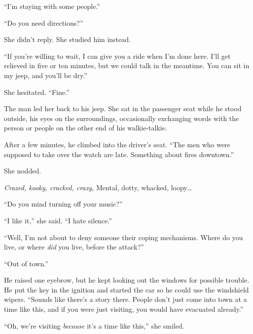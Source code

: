 ``I'm staying with some people.''



``Do you need directions?''



She didn't reply.  She studied him instead.



``If you're willing to wait, I can give you a ride when I'm done here.  I'll get relieved in five or ten minutes, but we could talk in the meantime.  You can sit in my jeep, and you'll be dry.''



She hesitated.  ``Fine.''



The man led her back to his jeep.  She sat in the passenger seat while he stood outside, his eyes on the surroundings, occasionally exchanging words with the person or people on the other end of his walkie-talkie.



After a few minutes, he climbed into the driver's seat.  ``The men who were supposed to take over the watch are late.  Something about fires downtown.''



She nodded.



\emph{Crazed, kooky, cracked, crazy,}
Mental, dotty, whacked, loopy\ldots



``Do you mind turning off your music?''



``I like it,'' she said.  ``I hate silence.''



``Well, I'm not about to deny someone their coping mechanisms.  Where do you live, or where \emph{did} you live, before the attack?''



``Out of town.''



He raised one eyebrow, but he kept looking out the windows for possible trouble.  He put the key in the ignition and started the car so he could use the windshield wipers.  ``Sounds like there's a story there.  People don't just come into town at a time like this, and if you were just visiting, you would have evacuated already.''



``Oh, we're visiting \emph{because} it's a time like this,'' she smiled.



